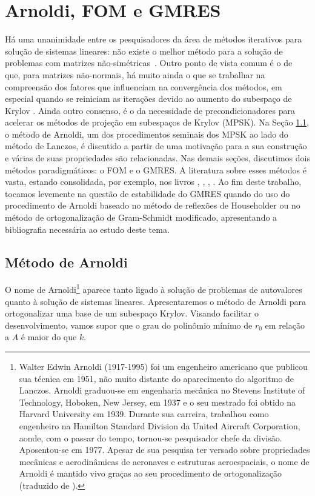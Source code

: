 
\chapter{Arnoldi, FOM e GMRES}
\label{chap:gmes}

Há uma unanimidade entre os pesquisadores da área de métodos iterativos para solução de sistemas lineares: não existe o melhor método para a solução de problemas com matrizes não-simétricas~\cite{NachtigalReddyEtAl1992How}. Outro ponto de vista comum é o de que, para matrizes não-normais, há muito ainda o  que se trabalhar na compreensão dos fatores que influenciam na convergência dos métodos, em especial quando se reiniciam as iterações devido ao aumento do subespaço de Krylov \cite{Meurant2024}. Ainda outro consenso, é o da necessidade de precondicionadores para acelerar os métodos de projeção em subespaços de Krylov (MPSK). Na Seção \ref{arnol_sec_arnol}, o método de Arnoldi,  um dos procedimentos seminais dos MPSK ao lado do método de Lanczos, é discutido a partir de uma motivação para a sua construção e várias de suas propriedades são relacionadas. Nas demais seções, discutimos dois métodos paradigmáticos: o FOM e o GMRES. A literatura sobre esses métodos é vasta, estando consolidada, por exemplo, nos livros \cite{Brezinski2002Outils}, \cite{Greenbaum97Iterative}, \cite{Meurant2020Krylov} \cite{Saad03Iterative},  \cite{Vorst03Iterative}.  Ao fim deste trabalho, tocamos levemente na questão de estabilidade do GMRES quando do uso  do procedimento de Arnoldi baseado no método de reflexões de Householder ou no método de ortogonalização de Gram-Schmidt modificado,  apresentando a bibliografia necessária ao estudo deste tema. 

\section{Método de Arnoldi}\label{arnol_sec_arnol}
O nome de Arnoldi\footnote{Walter Edwin Arnoldi (1917-1995) foi um engenheiro americano que publicou sua técnica em 1951, não muito distante do aparecimento do algoritmo de Lanczos. Arnoldi graduou-se em engenharia mecânica no Stevens Institute of Technology, Hoboken, New
Jersey, em 1937 e o seu mestrado foi obtido na Harvard University em 1939. Durante sua carreira, trabalhou como engenheiro na Hamilton Standard Division da United Aircraft Corporation, aonde, com o passar do tempo, tornou-se pesquisador chefe da divisão. Aposentou-se em 1977. Apesar de sua pesquisa ter versado sobre propriedades mecânicas e aerodinâmicas de aeronaves e estruturas aeroespaciais, o nome de Arnoldi é mantido vivo graças ao seu procedimento de ortogonalização (traduzido de \cite{Meyer00Matrix}).} aparece tanto ligado à solução de problemas de autovalores quanto à solução de sistemas lineares.  Apresentaremos o método de Arnoldi \cite{Arnoldi51principle} para ortogonalizar uma base de um subespaço Krylov.
 Visando facilitar o desenvolvimento, vamos supor que o grau do polinômio mínimo  de $r_0$ em relação a $A$ é maior do que $k$.

